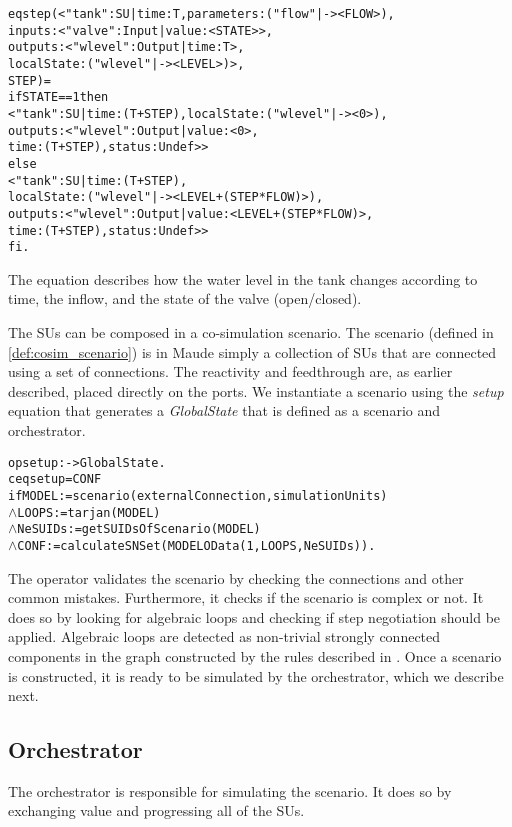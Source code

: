 \begin{alltt}
  \small
  eq step(< "tank" : SU | time : T, parameters : ("flow" |-> < FLOW >), 
                      inputs : < "valve" : Input | value : < STATE > >, 
                      outputs : < "wlevel" : Output | time : T >,
                      localState : ( "wlevel" |-> < LEVEL > ) >,
                      STEP) = 
  if STATE == 1 then 
      < "tank" : SU | time:(T+STEP), localState : ( "wlevel" |-> < 0 > ),
      outputs : < "wlevel" : Output | value : < 0 >, 
      time : (T + STEP), status : Undef > >
    else 
      < "tank" : SU | time : (T + STEP), 
      localState : ( "wlevel" |-> < LEVEL + (STEP * FLOW) > ), 
      outputs :< "wlevel" : Output|value : < LEVEL + (STEP * FLOW) >, 
      time : (T + STEP), status : Undef > > 
  fi .
\end{alltt}

The equation describes how the water level in the tank changes according to time, the inflow, and the state of the valve (open/closed).

The SUs can be composed in a co-simulation scenario.
The scenario (defined in \cref{def:cosim_scenario}) is in Maude simply a collection of SUs that are connected using a set of connections.
The reactivity and feedthrough are, as earlier described, placed directly on the ports.
We instantiate a scenario using the \emph{setup} equation that generates a \emph{GlobalState} that is defined as a scenario and orchestrator.
\begin{alltt}
  \small
  op setup : -> GlobalState .
  ceq setup = { CONF }
    if MODEL := scenario(externalConnection, simulationUnits)
    \(\land\) LOOPS := tarjan(MODEL)
    \(\land\) NeSUIDs := getSUIDsOfScenario(MODEL)
    \(\land\) CONF := calculateSNSet(MODEL OData(1,LOOPS, NeSUIDs)) .
\end{alltt}

The operator validates the scenario by checking the connections and other common mistakes.
Furthermore, it checks if the scenario is complex or not.
It does so by looking for algebraic loops and checking if step negotiation should be applied.
Algebraic loops are detected as non-trivial strongly connected components in the graph constructed by the rules described in . 
Once a scenario is constructed, it is ready to be simulated by the orchestrator, which we describe next. 

\subsection{Orchestrator}
The orchestrator is responsible for simulating the scenario.
It does so by exchanging value and progressing all of the SUs.


